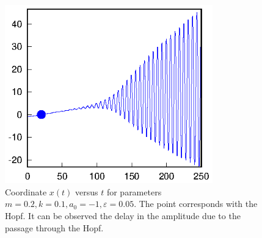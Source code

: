 \documentclass[a4paper,preprint,11pt]{article}
\begin{document}
\begin{figure}[h!]
  \begin{center}
  \includegraphics[width=9cm]{Sp_PWL_dibu1.eps}
  \end{center}
  \caption{Coordinate $x(t)$ versus $t$ for parameters $m=0.2,k=0.1,a_0=-1,\varepsilon=0.05$. The point corresponds with the Hopf. It can be observed the delay in the amplitude due to the passage through the Hopf.}
\end{figure}
\end{document}
